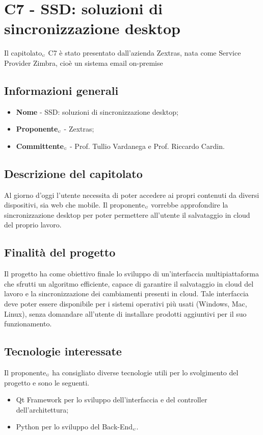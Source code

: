 \chapter{C7 - SSD: soluzioni di sincronizzazione desktop}
\label{CapitolatoC7}
Il capitolato$_{\scaleto{G}{3pt}}$ C7 è stato presentato dall'azienda Zextras, nata come Service Provider Zimbra, cioè un sistema email on-premise
\section{Informazioni generali} \label{C7InformazioniGenerali}
\begin{itemize}
	\item \textbf{Nome} - SSD: soluzioni di sincronizzazione desktop;
	\item \textbf{Proponente}$_{\scaleto{G}{3pt}}$ - Zextras;
	\item \textbf{Committente}$_{\scaleto{G}{3pt}}$ - Prof. Tullio Vardanega e Prof. Riccardo Cardin.
\end{itemize}
\section{Descrizione del capitolato} \label{C7DescrizioneDelCapitolato}
Al giorno d'oggi l'utente necessita di poter accedere ai propri contenuti da diversi dispositivi, sia web che mobile. Il proponente$_{\scaleto{G}{3pt}}$ vorrebbe approfondire la sincronizzazione desktop per poter permettere all'utente il salvataggio in cloud del proprio lavoro.
\section{Finalità del progetto} \label{C7FinalitàDelProgetto}
Il progetto ha come obiettivo finale lo sviluppo di un'interfaccia multipiattaforma che sfrutti un algoritmo efficiente, capace di garantire il salvataggio in cloud del lavoro e la sincronizzazione dei cambiamenti presenti in cloud. Tale interfaccia deve poter essere disponibile per i sistemi operativi più usati (Windows, Mac, Linux), senza domandare all'utente di installare prodotti aggiuntivi per il suo funzionamento. 
\section{Tecnologie interessate} \label{C7TecnologieInteressate}
Il proponente$_{\scaleto{G}{3pt}}$ ha consigliato diverse tecnologie utili per lo svolgimento del progetto e sono le seguenti.
\begin{itemize}
	\item Qt Framework per lo sviluppo dell'interfaccia e del controller dell'architettura;
	\item Python per lo sviluppo del Back-End$_{\scaleto{G}{3pt}}$.
\end{itemize}
